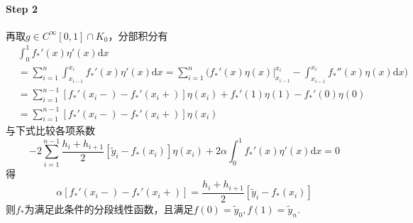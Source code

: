 \documentclass[12pt, a4paper]{article}
\theoremstyle{margin}
\newcommand{\rd}{\mathrm{d}}
\begin{document}
\paragraph{Step 2} 再取$g \in C^{\infty}[0, 1] \cap K_0$，分部积分有
\[\begin{split}
& \int_{0}^{1} f_*'(x)\eta'(x) \rd x \\
& = \sum_{i = 1}^{n} \int_{x_{i - 1}}^{x_{i}} f_*'(x)\eta'(x) \rd x = \sum_{i = 1}^{n} \bigg(f_*'(x)\eta(x) \bigg|_{x_{i - 1}}^{x_i} - \int_{x_{i - 1}}^{x_{i}} f_*''(x)\eta(x) \rd x\bigg) \\
& = \sum_{i = 1}^{n - 1} [f_*'(x_i-) - f_*'(x_i+)]\eta(x_i) + f_*'(1)\eta(1) - f_*'(0)\eta(0) \\
& = \sum_{i = 1}^{n - 1} [f_*'(x_i-) - f_*'(x_i+)]\eta(x_i)
\end{split}\]
与下式比较各项系数
\[-2 \sum_{i = 1}^{n - 1} \frac{h_{i} + h_{i + 1}}{2}[\tilde y_i - f_*(x_i)]\eta(x_i) + 2\alpha \int_{0}^{1} f_*'(x)\eta'(x) \mathrm{d}x = 0\]
得
\[\alpha[f_*'(x_i-) - f_*'(x_i+)] = \frac{h_{i} + h_{i + 1}}{2}[\tilde y_i - f_*(x_i)]\]
则$f_*$为满足此条件的分段线性函数，且满足$f(0) = \tilde y_0, f(1) = \tilde y_n$.
\end{document}

